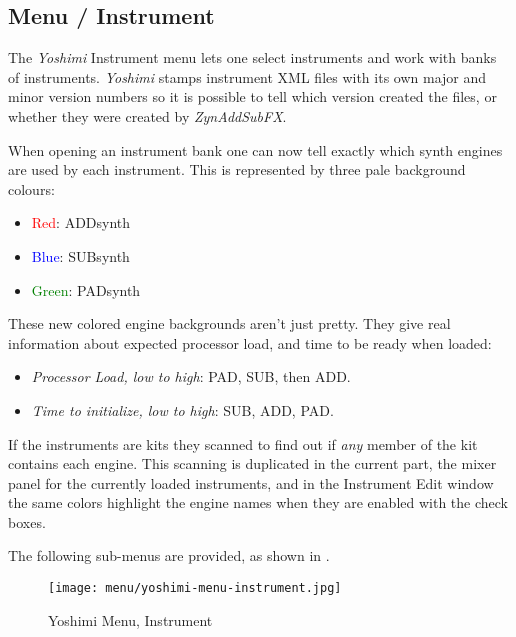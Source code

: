 \subsection{Menu / Instrument}
\label{subsec:menu_instrument}

   The \textsl{Yoshimi} Instrument menu lets one select instruments and work
   with banks of instruments.
   \textsl{Yoshimi} stamps instrument XML files with its own major and minor
   version numbers so it is possible to tell which version created the files,
   or whether they were created by \textsl{ZynAddSubFX}.

   When opening an instrument bank one can now tell exactly which synth engines
   are used by each instrument. This is represented by three pale background
   colours:

   \begin{itemize}
      \item \textcolor{red}{Red}: ADDsynth
      \item \textcolor{blue}{Blue}: SUBsynth
      \item \textcolor{green}{Green}: PADsynth
   \end{itemize}

   These new colored engine backgrounds aren't just pretty. They give real
   information about expected processor load, and time to be ready when
   loaded:

   \begin{itemize}
      \item \textsl{Processor Load, low to high}: PAD, SUB, then ADD.
      \item \textsl{Time to initialize, low to high}: SUB, ADD, PAD.
   \end{itemize}

   If the instruments are kits they scanned to find out if 
   \textsl{any} member of the kit contains each engine.
   This scanning is duplicated in the current part, the mixer panel for the
   currently loaded instruments, and in the Instrument Edit window the same
   colors highlight the engine names when they are enabled with the check
   boxes. 

   The following sub-menus are provided, as shown in
   .

\begin{figure}[H]
   \centering 
   \texttt{[image: menu/yoshimi-menu-instrument.jpg]}
   \caption{Yoshimi Menu, Instrument}
   \label{fig:yoshimi_instrument_menu}
\end{figure}

